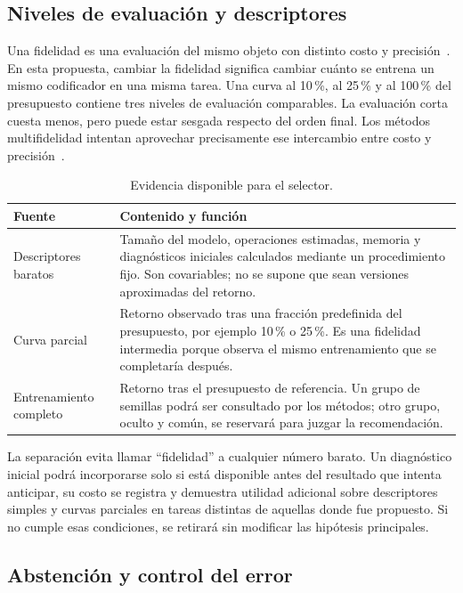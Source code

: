 \documentclass[11pt,letterpaper]{article}
\begin{document}
\subsection{Niveles de evaluación y descriptores}

Una fidelidad es una evaluación del mismo objeto con distinto costo y precisión~\cite{peherstorfer2018survey}.
En esta propuesta, cambiar la fidelidad significa cambiar cuánto se entrena un mismo codificador en una misma tarea.
Una curva al 10\,\%, al 25\,\% y al 100\,\% del presupuesto contiene tres niveles de evaluación comparables.
La evaluación corta cuesta menos, pero puede estar sesgada respecto del orden final.
Los métodos multifidelidad intentan aprovechar precisamente ese intercambio entre costo y precisión~\cite{poiani2022mfbai,poiani2024optimal}.

\begin{table}[htbp]
\centering
\caption{Evidencia disponible para el selector.}
\label{tab:evidence}
\begin{tabularx}{\textwidth}{@{}L{3.3cm}Y@{}}
\toprule
\textbf{Fuente} & \textbf{Contenido y función} \\
\midrule
Descriptores baratos &
Tamaño del modelo, operaciones estimadas, memoria y diagnósticos iniciales calculados mediante un procedimiento fijo.
Son covariables; no se supone que sean versiones aproximadas del retorno. \\
Curva parcial &
Retorno observado tras una fracción predefinida del presupuesto, por ejemplo 10\,\% o 25\,\%.
Es una fidelidad intermedia porque observa el mismo entrenamiento que se completaría después. \\
Entrenamiento completo &
Retorno tras el presupuesto de referencia.
Un grupo de semillas podrá ser consultado por los métodos; otro grupo, oculto y común, se reservará para juzgar la recomendación. \\
\bottomrule
\end{tabularx}
\end{table}

La separación evita llamar \enquote{fidelidad} a cualquier número barato.
Un diagnóstico inicial podrá incorporarse solo si está disponible antes del resultado que intenta anticipar, su costo se registra y demuestra utilidad adicional sobre descriptores simples y curvas parciales en tareas distintas de aquellas donde fue propuesto.
Si no cumple esas condiciones, se retirará sin modificar las hipótesis principales.

\subsection{Abstención y control del error}
\end{document}
